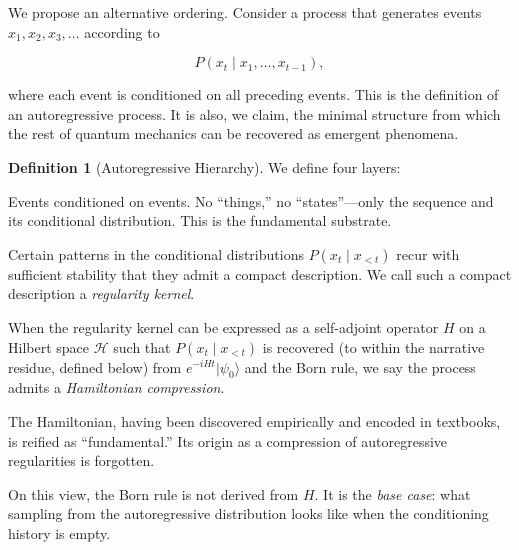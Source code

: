 \documentclass[12pt,a4paper]{article}
\theoremstyle{definition}
\newtheorem{definition}[theorem]{Definition}
\theoremstyle{remark}
\newcommand{\Hil}{\mathcal{H}}
\newcommand{\ket}[1]{|#1\rangle}
\begin{document}
We propose an alternative ordering.  Consider a process that generates
events $x_1, x_2, x_3, \ldots$ according to

\begin{equation}\label{eq:autoregressive}
  P(x_t \mid x_1, \ldots, x_{t-1}),
\end{equation}

\noindent where each event is conditioned on all preceding events.
This is the definition of an autoregressive process.  It is also,
we claim, the minimal structure from which the rest of quantum
mechanics can be recovered as emergent phenomena.

\begin{definition}[Autoregressive Hierarchy]
\label{def:hierarchy}
We define four layers:

\begin{description}[leftmargin=2em]
  \item[Layer 0: Autoregressive process.]
    Events conditioned on events.  No ``things,'' no ``states''---only
    the sequence and its conditional distribution.  This is the
    fundamental substrate.

  \item[Layer 1: Statistical regularities.]
    Certain patterns in the conditional distributions
    $P(x_t \mid x_{<t})$ recur with sufficient stability that they
    admit a compact description.  We call such a compact description
    a \emph{regularity kernel}.

  \item[Layer 2: Hamiltonian.]
    When the regularity kernel can be expressed as a self-adjoint
    operator $H$ on a Hilbert space $\Hil$ such that
    $P(x_t \mid x_{<t})$ is recovered (to within the narrative
    residue, defined below) from $e^{-iHt}\ket{\psi_0}$ and the
    Born rule, we say the process admits a \emph{Hamiltonian
    compression}.

  \item[Layer 3: Physical law.]
    The Hamiltonian, having been discovered empirically and encoded
    in textbooks, is reified as ``fundamental.''  Its origin as a
    compression of autoregressive regularities is forgotten.
\end{description}
\end{definition}

On this view, the Born rule is not derived from $H$.  It is the
\emph{base case}: what sampling from the autoregressive distribution
looks like when the conditioning history is empty.
\end{document}
